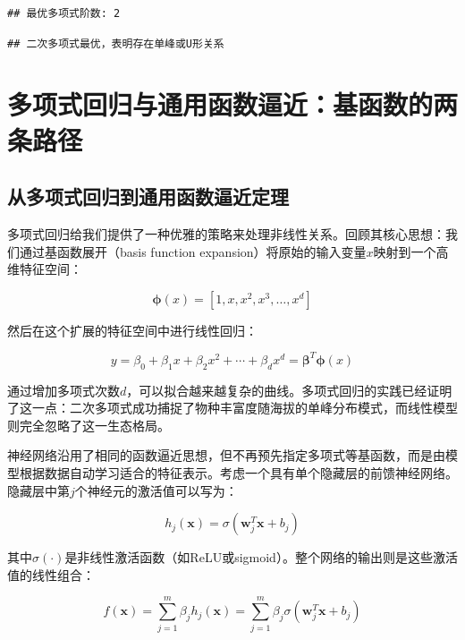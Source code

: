 \documentclass[
  twoside,12pt,fontset=none]{ctexbook}
\begin{document}
\begin{verbatim}
## 最优多项式阶数: 2
\end{verbatim}

\begin{verbatim}
## 二次多项式最优，表明存在单峰或U形关系
\end{verbatim}

\hypertarget{ux591aux9879ux5f0fux56deux5f52ux4e0eux901aux7528ux51fdux6570ux903cux8fd1ux57faux51fdux6570ux7684ux4e24ux6761ux8defux5f84}{%
\section{多项式回归与通用函数逼近：基函数的两条路径}\label{ux591aux9879ux5f0fux56deux5f52ux4e0eux901aux7528ux51fdux6570ux903cux8fd1ux57faux51fdux6570ux7684ux4e24ux6761ux8defux5f84}}

\hypertarget{ux4eceux591aux9879ux5f0fux56deux5f52ux5230ux901aux7528ux51fdux6570ux903cux8fd1ux5b9aux7406}{%
\subsection{从多项式回归到通用函数逼近定理}\label{ux4eceux591aux9879ux5f0fux56deux5f52ux5230ux901aux7528ux51fdux6570ux903cux8fd1ux5b9aux7406}}

多项式回归给我们提供了一种优雅的策略来处理非线性关系。回顾其核心思想：我们通过基函数展开（basis function expansion）将原始的输入变量\(x\)映射到一个高维特征空间：

\[\boldsymbol{\phi}(x) = [1, x, x^2, x^3, \ldots, x^d]\]

然后在这个扩展的特征空间中进行线性回归：

\[y = \beta_0 + \beta_1 x + \beta_2 x^2 + \cdots + \beta_d x^d = \boldsymbol{\beta}^T \boldsymbol{\phi}(x)\]

通过增加多项式次数\(d\)，可以拟合越来越复杂的曲线。多项式回归的实践已经证明了这一点：二次多项式成功捕捉了物种丰富度随海拔的单峰分布模式，而线性模型则完全忽略了这一生态格局。

神经网络沿用了相同的函数逼近思想，但不再预先指定多项式等基函数，而是由模型根据数据自动学习适合的特征表示。考虑一个具有单个隐藏层的前馈神经网络。隐藏层中第\(j\)个神经元的激活值可以写为：

\[h_j(\mathbf{x}) = \sigma(\mathbf{w}_j^T \mathbf{x} + b_j)\]

其中\(\sigma(\cdot)\)是非线性激活函数（如ReLU或sigmoid）。整个网络的输出则是这些激活值的线性组合：

\[f(\mathbf{x}) = \sum_{j=1}^{m} \beta_j h_j(\mathbf{x}) = \sum_{j=1}^{m} \beta_j \sigma(\mathbf{w}_j^T \mathbf{x} + b_j)\]
\end{document}
